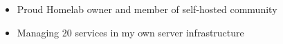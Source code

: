 \documentclass[10pt,a4paper,ragged2e,withhyper]{altacv/altacv}
\begin{document}
\begin{paracol}{2}

\begin{itemize}
\item Proud Homelab owner and member of self-hosted community
\item Managing 20 services in my own server infrastructure
\end{itemize}













\switchcolumn


\end{paracol}
\end{document}
